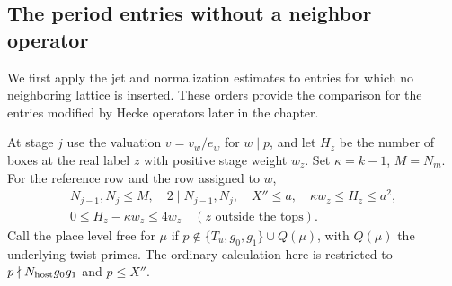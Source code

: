 \subsection{The period entries without a neighbor operator}
\label{subsec:unserved-period}
\hypertarget{source-unserved-period}{}

We first apply the jet and normalization estimates to entries for which no neighboring lattice is inserted. These orders provide the comparison for the entries modified by Hecke operators later in the chapter.

\begin{established}\label{hyp:unserved-level-free}
At stage \(j\) use the valuation \(v=v_w/e_w\) for \(w\mid p\),
and let \(H_z\) be the number of boxes at the real label \(z\) with
positive stage weight \(w_z\). Set \(\kappa=k-1\), \(M=N_m\).
For the reference row and the row assigned to \(w\),
\[
 \begin{gathered}
 N_{j-1},N_j\le M,\quad 2\mid N_{j-1},N_j,\quad X''\le a,\quad
 \kappa w_z\le H_z\le a^2,\\
 0\le H_z-\kappa w_z\le4w_z\quad (z\text{ outside the tops}).
 \end{gathered}
\]
Call the place level free for \(\mu\) if
\(p\notin\{T_u,g_0,g_1\}\cup Q(\mu)\), with \(Q(\mu)\) the underlying
twist primes. The ordinary calculation here is restricted to
\(p\nmid N_{\rm host}g_0g_1\) and \(p\le X''\).
\end{established}
